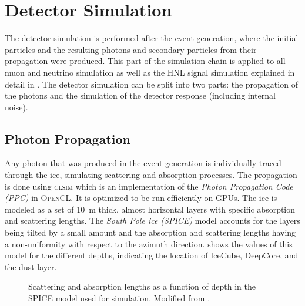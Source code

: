 \section{Detector Simulation} 

The detector simulation is performed after the event generation, where the initial particles and the resulting photons and secondary particles from their propagation were produced. This part of the simulation chain is applied to all muon and neutrino simulation as well as the HNL signal simulation explained in detail in . The detector simulation can be split into two parts: the propagation of the photons and the simulation of the detector response (including internal noise).


\subsection{Photon Propagation} 

Any photon that was produced in the event generation is individually traced through the ice, simulating scattering and absorption processes.
The propagation is done using \textsc{clsim} \cite{clsim} which is an implementation of the \textit{Photon Propagation Code (\textsc{PPC})}  in \textsc{OpenCL}. It is optimized to be run efficiently on GPUs. The ice is modeled as a set of \SI{10}{\meter} thick, almost horizontal layers with specific absorption and scattering lengths. The \textit{South Pole ice (SPICE)} model  accounts for the layers being tilted by a small amount and the absorption and scattering lengths having a non-uniformity with respect to the azimuth direction.  shows the values of this model for the different depths, indicating the location of IceCube, DeepCore, and the dust layer.

\begin{figure}
    
	\caption[Depth dependent scattering and absorption lengths]{Scattering and absorption lengths as a function of depth in the SPICE model used for simulation. Modified from \cite{ATrettin_phd}.}
\end{figure}


